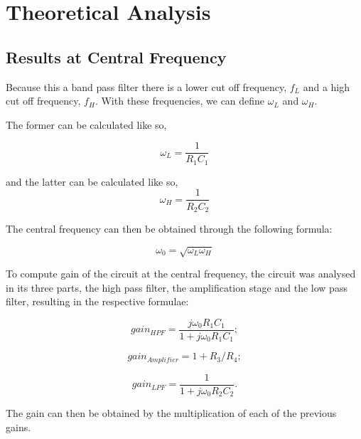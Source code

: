 \section{Theoretical Analysis}
\label{sec:theoretical analysis}

\subsection{Results at Central Frequency}

\indent

Because this a band pass filter there is a lower cut off frequency, $f_L$ and a high cut off frequency, $f_H$. With these frequencies, we can define $\omega_L$ and $\omega_H$.

The former can be calculated like so,


\[\omega_L = \frac{1}{R_1 C_1}\tag{1}\label{1}\]

and the latter can be calculated like so, \[\omega_H = \frac{1}{R_2 C_2}\tag{2}\label{2}\]

The central frequency can then be obtained through the following formula: 

\[\omega _0 =\sqrt{\omega _L \omega _H}\tag{3}\label{3}\]

\vspace{0.5cm}
\begin{center}
\end{center}

\vspace{1cm}

To compute gain of the circuit at the central frequency, the circuit was analysed in its three parts,  the high pass filter, the amplification stage and the low pass filter, resulting in the respective formulae:

\vspace{0.5cm}

\[gain_{HPF}=\frac{j\omega _0 R_1 C_1}{1+j \omega _0 R_1 C_1};\tag{4}\label{4}\]
 
\[gain_{Amplifier}=1+R_3/R_4;\tag{5}\label{5}\]
 
\[gain_{LPF} = \frac{1}{1+j \omega _0 R_2 C_2}.\tag{6}\label{6}\]
 
\vspace{1cm}
 
The gain can then be obtained by the multiplication of each of the previous gains.
 


